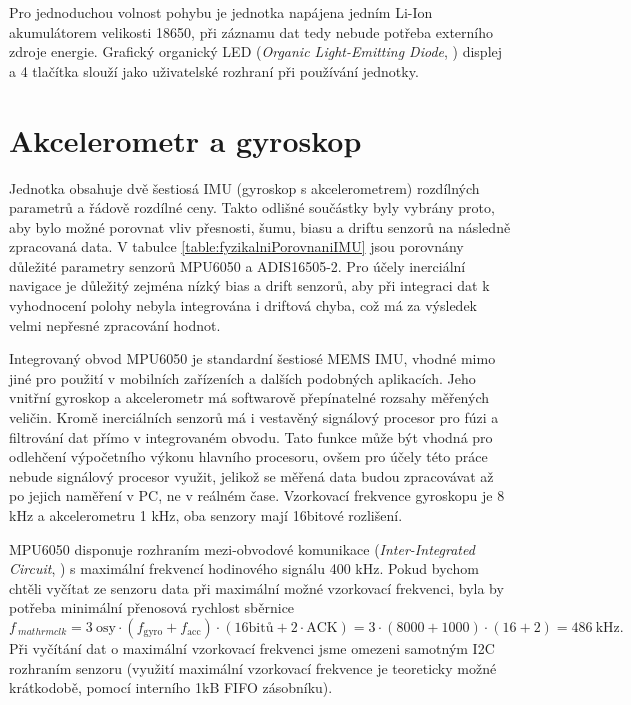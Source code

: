 Pro jednoduchou volnost pohybu je jednotka napájena jedním Li-Ion akumulátorem velikosti 18650, při záznamu dat tedy nebude potřeba externího zdroje energie. Grafický organický LED (\emph{Organic Light-Emitting Diode}, ) displej a 4 tlačítka slouží jako uživatelské rozhraní při používání jednotky.

\section{Akcelerometr a gyroskop} \label{AccGyroText}
Jednotka obsahuje dvě šestiosá \ac{IMU} (gyroskop s akcelerometrem) rozdílných parametrů a řádově rozdílné ceny. Takto odlišné součástky byly vybrány proto, aby bylo možné porovnat vliv přesnosti, šumu, biasu a driftu senzorů na následně zpracovaná data.
V tabulce \ref{table:fyzikalniPorovnaniIMU} jsou porovnány důležité parametry senzorů MPU6050 a ADIS16505-2. Pro účely inerciální navigace je důležitý zejména nízký bias a drift senzorů, aby při integraci dat k vyhodnocení polohy nebyla integrována i driftová chyba, což má za výsledek velmi nepřesné zpracování hodnot. \cite{Blocher2021322}

Integrovaný obvod MPU6050 je standardní šestiosé \ac{MEMS} \ac{IMU}, vhodné mimo jiné pro použití v mobilních zařízeních a dalších podobných aplikacích. Jeho vnitřní gyroskop a akcelerometr má softwarově přepínatelné rozsahy měřených veličin. Kromě inerciálních senzorů má i vestavěný signálový procesor pro fúzi a filtrování dat přímo v integrovaném obvodu. Tato funkce může být vhodná pro odlehčení výpočetního výkonu hlavního procesoru, ovšem pro účely této práce nebude signálový procesor využit, jelikož se měřená data budou zpracovávat až po jejich naměření v PC, ne v reálném čase. Vzorkovací frekvence gyroskopu je 8 kHz a akcelerometru 1 kHz, oba senzory mají 16bitové rozlišení.
\cite{euxR3Yh5ol4JWNAi}

MPU6050 disponuje rozhraním mezi-obvodové komunikace (\emph{Inter-Integrated Circuit}, ) s maximální frekvencí hodinového signálu 400 kHz. \cite{euxR3Yh5ol4JWNAi}
Pokud bychom chtěli vyčítat ze senzoru data při maximální možné vzorkovací frekvenci, byla by potřeba minimální přenosová rychlost sběrnice
\begin{equation}
f_{\
mathrm{clk}}=3~\mathrm{osy} \cdot(f_{\mathrm{gyro}} + f_{\mathrm{acc}})\cdot (\mathrm{16bitů} + 2 \cdot \mathrm{ACK})=3\cdot(8000+1000)\cdot(16+2)=\SI{486}{\kilo\hertz} .
\end{equation}
Při vyčítání dat o maximální vzorkovací frekvenci jsme omezeni samotným \ac{I2C} rozhraním senzoru (využití maximální vzorkovací frekvence je teoreticky možné krátkodobě, pomocí interního 1kB FIFO zásobníku).\cite{euxR3Yh5ol4JWNAi}

